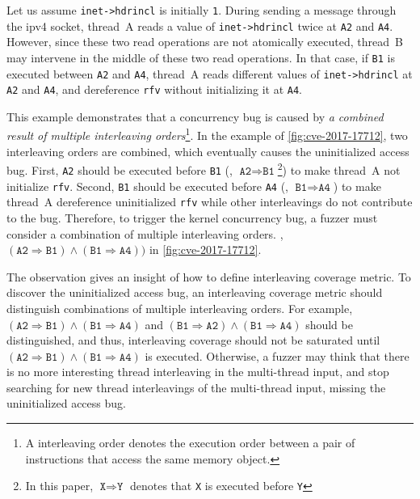 Let us assume \texttt{inet->hdrincl} is initially \texttt{1}.
%
During sending a message through the ipv4 socket, thread~A reads a
value of \texttt{inet->hdrincl} twice at \texttt{A2} and \texttt{A4}.
%
However, since these two read operations are not atomically executed,
thread~B may intervene in the middle of these two read operations.
%
In that case, if \texttt{B1} is executed between \texttt{A2} and
\texttt{A4}, thread~A reads different values of \texttt{inet->hdrincl}
at \texttt{A2} and \texttt{A4}, and dereference \texttt{rfv} without
initializing it at \texttt{A4}.


%
This example demonstrates that a concurrency bug is caused by
\textit{a combined result of multiple interleaving orders}\footnote{A
  interleaving order denotes the execution order between a pair of
  instructions that access the same memory object.}.
%
In the example of \autoref{fig:cve-2017-17712}, two interleaving orders
are combined, which eventually causes the uninitialized access bug.
%
First, \texttt{A2} should be executed before \texttt{B1} (\ie,
$\texttt{A2} \Rightarrow \texttt{B1}$\footnote{In this paper,
  $\texttt{X} \Rightarrow \texttt{Y}$ denotes that \texttt{X} is
  executed before \texttt{Y}}) to make thread~A not initialize
\texttt{rfv}.
%
Second, \texttt{B1} should be executed before \texttt{A4} (\ie,
$\texttt{B1} \Rightarrow \texttt{A4}$) to make thread~A dereference
uninitialized \texttt{rfv} while other interleavings do not 
contribute to the bug.
%
Therefore, to trigger the kernel concurrency bug, a fuzzer must
consider a combination of multiple interleaving orders. \eg, 
$(\texttt{A2} \Rightarrow \texttt{B1}) \wedge (\texttt{B1} \Rightarrow
\texttt{A4}))$ in \autoref{fig:cve-2017-17712}.


 The observation
gives an insight of how to define interleaving coverage metric.  To
discover the uninitialized access bug, an interleaving coverage metric
should distinguish combinations of multiple interleaving orders.
%
For example,
$(\texttt{A2} \Rightarrow \texttt{B1}) \wedge (\texttt{B1} \Rightarrow
\texttt{A4})$ and
$(\texttt{B1} \Rightarrow \texttt{A2}) \wedge (\texttt{B1} \Rightarrow
\texttt{A4})$ should be distinguished, and thus, interleaving coverage
should not be saturated until
$(\texttt{A2} \Rightarrow \texttt{B1}) \wedge (\texttt{B1} \Rightarrow
\texttt{A4})$ is executed.
%
Otherwise, a fuzzer may think that there is no more interesting thread
interleaving in the multi-thread input, and stop searching for new
thread interleavings of the multi-thread input, missing the
uninitialized access bug.


